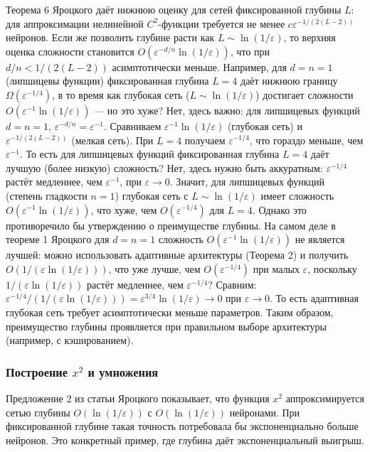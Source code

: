 \documentclass[12pt]{article}
\begin{document}
	Теорема 6 Яроцкого даёт нижнюю оценку для сетей фиксированной глубины $L$: для аппроксимации нелинейной $C^2$-функции требуется не менее $c\varepsilon^{-1/(2(L-2))}$ нейронов. Если же позволить глубине расти как $L\sim\ln(1/\varepsilon)$, то верхняя оценка сложности становится $O(\varepsilon^{-d/n}\ln(1/\varepsilon))$, что при $d/n < 1/(2(L-2))$ асимптотически меньше. Например, для $d=n=1$ (липшицевы функции) фиксированная глубина $L=4$ даёт нижнюю границу $\Omega(\varepsilon^{-1/4})$, в то время как глубокая сеть ($L\sim\ln(1/\varepsilon)$) достигает сложности $O(\varepsilon^{-1}\ln(1/\varepsilon))$ — но это хуже? Нет, здесь важно: для липшицевых функций $d=n=1$, $\varepsilon^{-d/n} = \varepsilon^{-1}$. Сравниваем $\varepsilon^{-1}\ln(1/\varepsilon)$ (глубокая сеть) и $\varepsilon^{-1/(2(L-2))}$ (мелкая сеть). При $L=4$ получаем $\varepsilon^{-1/4}$, что гораздо меньше, чем $\varepsilon^{-1}$. То есть для липшицевых функций фиксированная глубина $L=4$ даёт лучшую (более низкую) сложность? Нет, здесь нужно быть аккуратным: $\varepsilon^{-1/4}$ растёт медленнее, чем $\varepsilon^{-1}$, при $\varepsilon\to0$. Значит, для липшицевых функций (степень гладкости $n=1$) глубокая сеть с $L\sim\ln(1/\varepsilon)$ имеет сложность $O(\varepsilon^{-1}\ln(1/\varepsilon))$, что хуже, чем $O(\varepsilon^{-1/4})$ для $L=4$. Однако это противоречило бы утверждению о преимуществе глубины. На самом деле в теореме 1 Яроцкого для $d=n=1$ сложность $O(\varepsilon^{-1}\ln(1/\varepsilon))$ не является лучшей: можно использовать адаптивные архитектуры (Теорема 2) и получить $O(1/(\varepsilon\ln(1/\varepsilon)))$, что уже лучше, чем $O(\varepsilon^{-1/4})$ при малых $\varepsilon$, поскольку $1/(\varepsilon\ln(1/\varepsilon))$ растёт медленнее, чем $\varepsilon^{-1/4}$? Сравним: $\varepsilon^{-1/4} / (1/(\varepsilon\ln(1/\varepsilon))) = \varepsilon^{3/4}\ln(1/\varepsilon) \to 0$ при $\varepsilon\to0$. То есть адаптивная глубокая сеть требует асимптотически меньше параметров. Таким образом, преимущество глубины проявляется при правильном выборе архитектуры (например, с кэшированием).
	
	\subsubsection*{Построение $x^2$ и умножения}
	
	Предложение 2 из статьи Яроцкого показывает, что функция $x^2$ аппроксимируется сетью глубины $O(\ln(1/\varepsilon))$ с $O(\ln(1/\varepsilon))$ нейронами. При фиксированной глубине такая точность потребовала бы экспоненциально больше нейронов. Это конкретный пример, где глубина даёт экспоненциальный выигрыш.
	
\end{document}

